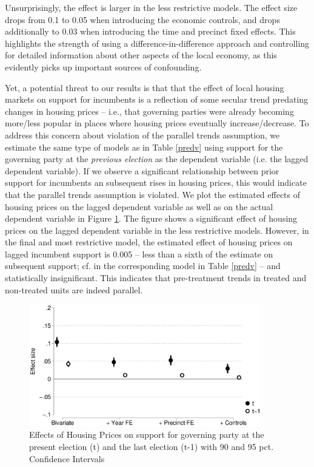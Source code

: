 \documentclass[12pt,a4paper]{article}
\begin{document}
	Unsurprisingly, the effect is larger in the less restrictive models. The effect size drops from 0.1 to 0.05 when introducing the economic controls, and drops additionally to 0.03 when introducing the time and precinct fixed effects. This highlights the strength of using a difference-in-difference approach and controlling for detailed information about other aspects of the local economy, as this evidently picks up important sources of confounding.
	
	Yet, a potential threat to our results is that that the effect of local housing markets on support for incumbents is a reflection of some secular trend predating changes in housing prices -- i.e., that governing parties were already becoming more/less popular in places where housing prices eventually increase/decrease. To address this concern about violation of the parallel trends assumption, we estimate the same type of models as in Table \ref{predv} using support for the governing party at the \textit{previous election} as the dependent variable (i.e. the lagged dependent variable). If we observe a significant relationship between prior support for incumbents an subsequent rises in housing prices, this would indicate that the parallel trends assumption is violated. We plot the estimated effects of housing prices on the lagged dependent variable as well as on the actual dependent variable in Figure \ref{placebo}. The figure shows a significant effect of housing prices on the lagged dependent variable in the less restrictive models. However, in the final and most restrictive model, the estimated effect of housing prices on lagged incumbent support is 0.005 -- less than a sixth of the estimate on subsequent support; cf. in the corresponding model in Table \ref{predv} -- and statistically insignificant. This indicates that pre-treatment trends in treated and non-treated units are indeed parallel.
	
	
	\begin{figure}[htbp!]
		\includegraphics[width=0.9\textwidth]{../figures/lagdv.eps}
		\centering
		\caption{Effects of Housing Prices on support for governing party at the present election (t) and the last election (t-1) with 90  and 95 pct. Confidence Intervals}\label{placebo}
	\end{figure}
	
\end{document}
